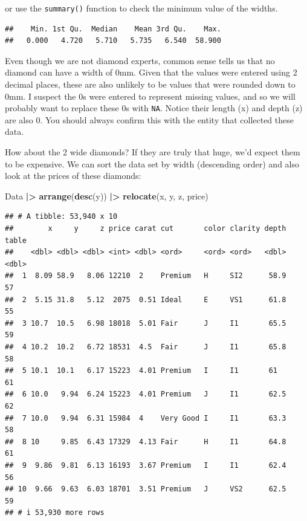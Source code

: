 \documentclass[
]{book}
\newenvironment{Shaded}{\begin{snugshade}}{\end{snugshade}}
\newcommand{\FunctionTok}[1]{\textcolor[rgb]{0.13,0.29,0.53}{\textbf{#1}}}
\newcommand{\NormalTok}[1]{#1}
\newcommand{\SpecialCharTok}[1]{\textcolor[rgb]{0.81,0.36,0.00}{\textbf{#1}}}
\theoremstyle{definition}
\theoremstyle{definition}
\theoremstyle{definition}
\theoremstyle{definition}
\theoremstyle{remark}
\begin{document}
or use the \texttt{summary()} function to check the minimum value of the widths.

\begin{Shaded}
\end{Shaded}

\begin{verbatim}
##    Min. 1st Qu.  Median    Mean 3rd Qu.    Max. 
##   0.000   4.720   5.710   5.735   6.540  58.900
\end{verbatim}

Even though we are not diamond experts, common sense tells us that no diamond can have a width of 0mm. Given that the values were entered using 2 decimal places, these are also unlikely to be values that were rounded down to 0mm. I suspect the 0s were entered to represent missing values, and so we will probably want to replace these 0s with \texttt{NA}. Notice their length (x) and depth (z) are also 0. You should always confirm this with the entity that collected these data.

How about the 2 wide diamonds? If they are truly that huge, we'd expect them to be expensive. We can sort the data set by width (descending order) and also look at the prices of these diamonds:

\begin{Shaded}
\begin{Highlighting}[]
\NormalTok{Data }\SpecialCharTok{|\textgreater{}} 
  \FunctionTok{arrange}\NormalTok{(}\FunctionTok{desc}\NormalTok{(y)) }\SpecialCharTok{|\textgreater{}} 
  \FunctionTok{relocate}\NormalTok{(x, y, z, price)}
\end{Highlighting}
\end{Shaded}

\begin{verbatim}
## # A tibble: 53,940 x 10
##        x     y     z price carat cut       color clarity depth table
##    <dbl> <dbl> <dbl> <int> <dbl> <ord>     <ord> <ord>   <dbl> <dbl>
##  1  8.09 58.9   8.06 12210  2    Premium   H     SI2      58.9    57
##  2  5.15 31.8   5.12  2075  0.51 Ideal     E     VS1      61.8    55
##  3 10.7  10.5   6.98 18018  5.01 Fair      J     I1       65.5    59
##  4 10.2  10.2   6.72 18531  4.5  Fair      J     I1       65.8    58
##  5 10.1  10.1   6.17 15223  4.01 Premium   I     I1       61      61
##  6 10.0   9.94  6.24 15223  4.01 Premium   J     I1       62.5    62
##  7 10.0   9.94  6.31 15984  4    Very Good I     I1       63.3    58
##  8 10     9.85  6.43 17329  4.13 Fair      H     I1       64.8    61
##  9  9.86  9.81  6.13 16193  3.67 Premium   I     I1       62.4    56
## 10  9.66  9.63  6.03 18701  3.51 Premium   J     VS2      62.5    59
## # i 53,930 more rows
\end{verbatim}
\end{document}
